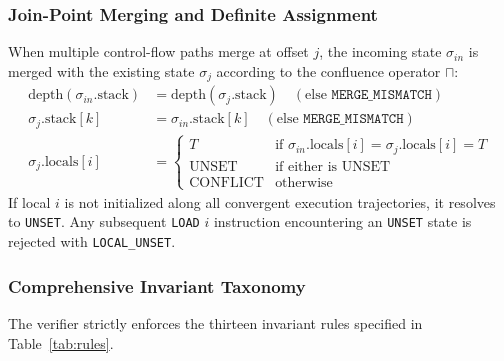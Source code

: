 \documentclass[conference]{IEEEtran}
\begin{document}
\subsubsection{Join-Point Merging and Definite Assignment}
When multiple control-flow paths merge at offset $j$, the incoming state $\sigma_{in}$ is merged with the existing state $\sigma_{j}$ according to the confluence operator $\sqcap$:
\begin{align}
\text{depth}(\sigma_{in}.\text{stack}) &= \text{depth}(\sigma_j.\text{stack}) \quad (\text{else } \texttt{MERGE\_MISMATCH}) \\
\sigma_j.\text{stack}[k] &= \sigma_{in}.\text{stack}[k] \quad (\text{else } \texttt{MERGE\_MISMATCH}) \\
\sigma_j.\text{locals}[i] &= \begin{cases}
T & \text{if } \sigma_{in}.\text{locals}[i] = \sigma_j.\text{locals}[i] = T \\
\text{UNSET} & \text{if either is } \text{UNSET} \\
\text{CONFLICT} & \text{otherwise}
\end{cases}
\end{align}
If local $i$ is not initialized along all convergent execution trajectories, it resolves to \texttt{UNSET}. Any subsequent \texttt{LOAD} $i$ instruction encountering an \texttt{UNSET} state is rejected with \texttt{LOCAL\_UNSET}.

\subsubsection{Comprehensive Invariant Taxonomy}
The verifier strictly enforces the thirteen invariant rules specified in Table~\ref{tab:rules}.
\end{document}
